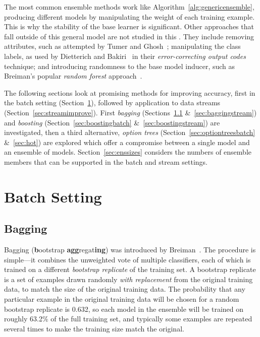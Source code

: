 The most common ensemble methods work like Algorithm~\ref{alg:genericensemble}, producing different models by manipulating the weight of each training example. This is why the stability of the base learner is significant. Other approaches that fall outside of this general model are not studied in this  \thesisc. They include removing attributes, such as attempted by Tumer and Ghosh~\cite{tgensembles}; manipulating the class labels, as used by Dietterich and Bakiri~\cite{ecoc} in their {\em error-correcting output codes} technique; and introducing randomness to the base model inducer, such as Breiman's popular {\em random forest} approach~\cite{randomforests}.

The following sections look at promising methods for improving accuracy, first in the batch setting (Section~\ref{sec:batchimprove}), followed by application to data streams (Section~\ref{sec:streamimprove}). 
First {\em bagging} (Sections~\ref{sec:baggingbatch} \&~\ref{sec:baggingstream}) and {\em boosting} (Section~\ref{sec:boostingbatch} \&~\ref{sec:boostingstream}) are investigated, then a third alternative, {\em option trees} (Section~\ref{sec:optiontreesbatch} \&~\ref{sec:hot}) are explored which offer a compromise between a single model and an ensemble of models.
Section~\ref{sec:enssizes} considers the numbers of ensemble members that can be supported in the batch and stream settings.

\section{Batch Setting}
\label{sec:batchimprove}

\subsection{Bagging}
\label{sec:baggingbatch}

Bagging ({\bf b}ootstrap {\bf agg}regat{\bf ing}) was introduced by Breiman~\cite{bagging}. The procedure is simple---it combines the unweighted vote of multiple classifiers, each of which is trained on a different {\em bootstrap replicate} of the training set. A bootstrap replicate is a set of examples drawn randomly {\em with replacement} from the original training data, to match the size of the original training data. The probability that any particular example in the original training data will be chosen for a random bootstrap replicate is 0.632, so each model in the ensemble will be trained on roughly 63.2\% of the full training set, and typically some examples are repeated several times to make the training size match the original.

